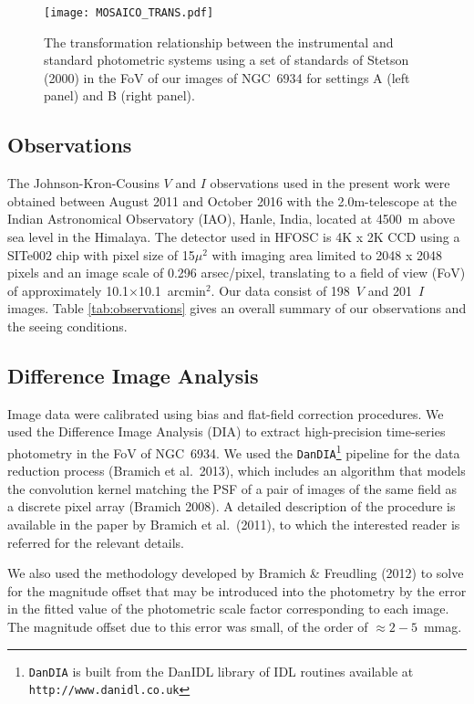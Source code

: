\documentclass[journal]{rmaa}
\newcommand{\1}{\'{\i}}
\begin{document}
\begin{figure*}[!t]
\begin{center}
\texttt{[image: MOSAICO\_TRANS.pdf]}
\caption{The transformation relationship between the instrumental and standard
photometric systems using a set of standards of Stetson (2000) in the FoV of our
images
of NGC~6934 for settings A (left panel) and B (right panel).}
    \label{trans}
\end{center}
\end{figure*}

\subsection{Observations}

The Johnson-Kron-Cousins $V$ and $I$ observations
used in the present work were obtained between  August 2011 and October 2016 with
the 2.0m-telescope at the Indian Astronomical Observatory (IAO), Hanle,
India, located at 4500~m above sea level in the Himalaya.
The detector used in HFOSC is 4K x 2K CCD
    using a SITe002 chip with pixel size of 15$\mu ^{2}$ with imaging area
    limited to 2048 x 2048 pixels and an image scale of 0.296 arsec/pixel, translating
to a field of view (FoV) of approximately
10.1$\times$10.1~arcmin$^2$. Our data consist of 198~$V$ and 201~$I$ images. Table
\ref{tab:observations}
gives an overall summary of our observations and the seeing conditions.

\subsection{Difference Image Analysis}
\label{DIA}

Image data were calibrated using bias and flat-field
correction procedures. We used the Difference Image Analysis (DIA)
to extract high-precision time-series photometry in the FoV of NGC~6934. We used
the
{\tt DanDIA}\footnote{{\tt DanDIA} is built from the DanIDL library of IDL routines
available at \texttt{http://www.danidl.co.uk}}
pipeline for the data reduction process (Bramich et al.\ 2013), which includes an
algorithm that models the convolution kernel matching the PSF
of a pair of images of the same field as a discrete pixel array (Bramich 2008).
A detailed description of the procedure is available in the paper by
 Bramich et al.\ (2011), to which the interested reader is referred for
the relevant details.

We also used the methodology developed by
Bramich \& Freudling (2012) to solve for the
magnitude offset that may be introduced into the photometry
by the error in the fitted value of the photometric scale factor
corresponding to each image.
The magnitude offset due to this error was small, of the order
of $\approx 2{-}5$~mmag.
\end{document}
